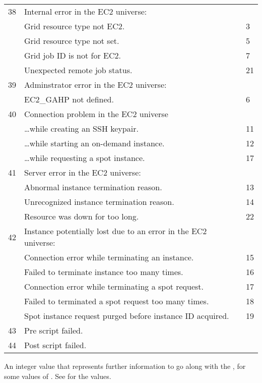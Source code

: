 \begin{description}
\begin{center}
\begin{longtable}{|p{2cm}p{9cm}|p{4cm}|}
   \hline
38 & Internal error in the EC2 universe: & \\
   & \hfill Grid resource type not EC2. & 3 \\
   & \hfill Grid resource type not set. & 5 \\
   & \hfill Grid job ID is not for EC2. & 7 \\
   & \hfill Unexpected remote job status. & 21 \\
   \hline
39 & Adminstrator error in the EC2 universe: & \\
   & \hfill EC2\_GAHP not defined. & 6 \\
   \hline
40 & Connection problem in the EC2 universe & \\
   & \hfill \ldots while creating an SSH keypair. & 11 \\
   & \hfill \ldots while starting an on-demand instance. & 12 \\
   & \hfill \ldots while requesting a spot instance. & 17 \\
   \hline
41 & Server error in the EC2 universe: & \\
   & \hfill Abnormal instance termination reason. & 13 \\
   & \hfill Unrecognized instance termination reason. & 14 \\
   & \hfill Resource was down for too long. & 22 \\
   \hline
42 & Instance potentially lost due to an error in the EC2 universe: & \\
   & \hfill Connection error while terminating an instance. & 15 \\
   & \hfill Failed to terminate instance too many times. & 16 \\
   & \hfill Connection error while terminating a spot request. & 17 \\
   & \hfill Failed to terminated a spot request too many times. & 18 \\
   & \hfill Spot instance request purged before instance ID acquired. & 19 \\
   \hline
43 & Pre script failed. & \\ \hline
44 & Post script failed. & \\ \hline
\end{longtable}
\end{center}

\item[\AdAttr{HoldReasonSubCode}:]    An integer value that represents further
information to go along with the , for
some values of .
See  for the values.


\end{description}
